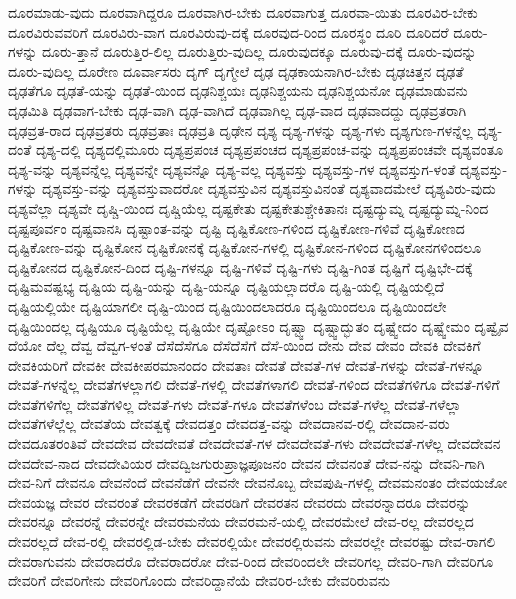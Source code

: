 {ದೂರಮಾಡು-ವುದು
ದೂರವಾಗಿದ್ದರೂ
ದೂರವಾಗಿರ-ಬೇಕು
ದೂರವಾಗುತ್ತ
ದೂರವಾ-ಯಿತು
ದೂರವಿರ-ಬೇಕು
ದೂರವಿರುವವರಿಗೆ
ದೂರವಿರು-ವಾಗ
ದೂರವಿರುವು-ದಕ್ಕೆ
ದೂರವುದ-ರಿಂದ
ದೂರಸ್ಥಂ
ದೂರಿ
ದೂರಿದರೆ
ದೂರು-ಗಳನ್ನು
ದೂರು-ತ್ತಾನೆ
ದೂರುತ್ತಿರ-ಲಿಲ್ಲ
ದೂರುತ್ತಿರು-ವುದಿಲ್ಲ
ದೂರುವುದಕ್ಕೂ
ದೂರುವು-ದಕ್ಕೆ
ದೂರು-ವುದನ್ನು
ದೂರು-ವುದಿಲ್ಲ
ದೂರೇಣ
ದೂರ್ವಾಸರು
ದೃಗ್
ದೃಗ್ಮೇಲೆ
ದೃಢ
ದೃಢಕಾಯನಾಗಿರ-ಬೇಕು
ದೃಢಚಿತ್ತನ
ದೃಢತೆ
ದೃಢತೆಗೂ
ದೃಢತೆ-ಯನ್ನು
ದೃಢತೆ-ಯಿಂದ
ದೃಢನಿಶ್ಚಯಃ
ದೃಢನಿಶ್ಚಯನು
ದೃಢನಿಶ್ಚಯನೋ
ದೃಢಮಾಡುವನು
ದೃಢಮಿತಿ
ದೃಢವಾಗ-ಬೇಕು
ದೃಢ-ವಾಗಿ
ದೃಢ-ವಾಗಿದೆ
ದೃಢವಾಗಿಲ್ಲ
ದೃಢ-ವಾದ
ದೃಢವಾದದ್ದು
ದೃಢವ್ರತರಾಗಿ
ದೃಢವ್ರತ-ರಾದ
ದೃಢವ್ರತರು
ದೃಢವ್ರತಾಃ
ದೃಢವ್ರತಿ
ದೃಢೇನ
ದೃಶ್ಯ
ದೃಶ್ಯ-ಗಳನ್ನು
ದೃಶ್ಯ-ಗಳು
ದೃಶ್ಯಗುಣ-ಗಳನ್ನೆಲ್ಲ
ದೃಶ್ಯ-ದಂತೆ
ದೃಶ್ಯ-ದಲ್ಲಿ
ದೃಶ್ಯದಲ್ಲಿಮೂರು
ದೃಶ್ಯಪ್ರಪಂಚ
ದೃಶ್ಯಪ್ರಪಂಚದ
ದೃಶ್ಯಪ್ರಪಂಚ-ವನ್ನು
ದೃಶ್ಯಪ್ರಪಂಚವೇ
ದೃಶ್ಯವಂತೂ
ದೃಶ್ಯ-ವನ್ನು
ದೃಶ್ಯವನ್ನೆಲ್ಲ
ದೃಶ್ಯವನ್ನೇ
ದೃಶ್ಯವನ್ನೊ
ದೃಶ್ಯ-ವಲ್ಲ
ದೃಶ್ಯವಸ್ತು
ದೃಶ್ಯವಸ್ತು-ಗಳ
ದೃಶ್ಯವಸ್ತುಗ-ಳಂತೆ
ದೃಶ್ಯವಸ್ತು-ಗಳನ್ನು
ದೃಶ್ಯವಸ್ತು-ವನ್ನು
ದೃಶ್ಯವಸ್ತುವಾದರೋ
ದೃಶ್ಯವಸ್ತುವಿನ
ದೃಶ್ಯವಸ್ತುವಿನಂತೆ
ದೃಶ್ಯವಾದಮೇಲೆ
ದೃಶ್ಯವಿರು-ವುದು
ದೃಶ್ಯವೆಲ್ಲಾ
ದೃಶ್ಯವೇ
ದೃಷ್ಚಿ-ಯಿಂದ
ದೃಷ್ಚಿಯೆಲ್ಲ
ದೃಷ್ಟಕೇತು
ದೃಷ್ಟಕೇತುಶ್ಚೇಕಿತಾನಃ
ದೃಷ್ಟದ್ಯುಮ್ನ
ದೃಷ್ಟದ್ಯುಮ್ನ-ನಿಂದ
ದೃಷ್ಟಪೂರ್ವಂ
ದೃಷ್ಟವಾನಸಿ
ದೃಷ್ಟಾಂತ-ವನ್ನು
ದೃಷ್ಟಿ
ದೃಷ್ಟಿಕೋಣ-ಗಳಿಂದ
ದೃಷ್ಟಿಕೋಣ-ಗಳಿವೆ
ದೃಷ್ಟಿಕೋಣದ
ದೃಷ್ಟಿಕೋಣ-ವನ್ನು
ದೃಷ್ಟಿಕೋನ
ದೃಷ್ಟಿಕೋನಕ್ಕೆ
ದೃಷ್ಟಿಕೋನ-ಗಳಲ್ಲಿ
ದೃಷ್ಟಿಕೋನ-ಗಳಿಂದ
ದೃಷ್ಟಿಕೋನಗಳಿಂದಲೂ
ದೃಷ್ಟಿಕೋನದ
ದೃಷ್ಟಿಕೋನ-ದಿಂದ
ದೃಷ್ಟಿ-ಗಳನ್ನೂ
ದೃಷ್ಟಿ-ಗಳಿವೆ
ದೃಷ್ಟಿ-ಗಳು
ದೃಷ್ಟಿ-ಗಿಂತ
ದೃಷ್ಟಿಗೆ
ದೃಷ್ಟಿಭೇ-ದಕ್ಕೆ
ದೃಷ್ಟಿಮವಷ್ಟಭ್ಯ
ದೃಷ್ಟಿಯ
ದೃಷ್ಟಿ-ಯನ್ನು
ದೃಷ್ಟಿ-ಯನ್ನೂ
ದೃಷ್ಟಿಯಲ್ಲಾದರೊ
ದೃಷ್ಟಿ-ಯಲ್ಲಿ
ದೃಷ್ಟಿಯಲ್ಲಿದೆ
ದೃಷ್ಟಿಯಲ್ಲಿಯೇ
ದೃಷ್ಟಿಯಾಗಲೀ
ದೃಷ್ಟಿ-ಯಿಂದ
ದೃಷ್ಟಿಯಿಂದಲಾದರೂ
ದೃಷ್ಟಿಯಿಂದಲೂ
ದೃಷ್ಟಿಯಿಂದಲೇ
ದೃಷ್ಟಿಯಿಂದಲ್ಲ
ದೃಷ್ಟಿಯೂ
ದೃಷ್ಟಿಯೆಲ್ಲ
ದೃಷ್ಟಿಯೇ
ದೃಷ್ಟೋಽಂ
ದೃಷ್ಟ್ವಾ
ದೃಷ್ಟ್ವಾದ್ಭುತಂ
ದೃಷ್ಟ್ವೇದಂ
ದೃಷ್ಟ್ವೇಮಂ
ದೃಷ್ವೈವ
ದೆಯೋ
ದೆಲ್ಲ
ದೆವ್ವ
ದೆವ್ವಗ-ಳಂತೆ
ದೆಸೆದೆಸೆಗೂ
ದೆಸೆದೆಸೆಗೆ
ದೆಸೆ-ಯಿಂದ
ದೇನು
ದೇವ
ದೇವಂ
ದೇವಕಿ
ದೇವಕಿಗೆ
ದೇವಕಿಯರಿಗೆ
ದೇವಕೀ
ದೇವಕೀಪರಮಾನಂದಂ
ದೇವತಾಃ
ದೇವತೆ
ದೇವತೆ-ಗಳ
ದೇವತೆ-ಗಳನ್ನು
ದೇವತೆ-ಗಳನ್ನೂ
ದೇವತೆ-ಗಳನ್ನೆಲ್ಲ
ದೇವತೆಗಳಲ್ಲಾಗಲಿ
ದೇವತೆ-ಗಳಲ್ಲಿ
ದೇವತೆಗಳಾಗಲಿ
ದೇವತೆ-ಗಳಿಂದ
ದೇವತೆಗಳಿಗೂ
ದೇವತೆ-ಗಳಿಗೆ
ದೇವತೆಗಳಿಗೆಲ್ಲ
ದೇವತೆಗಳಿಲ್ಲ
ದೇವತೆ-ಗಳು
ದೇವತೆ-ಗಳೂ
ದೇವತೆಗಳೆಂಬ
ದೇವತೆ-ಗಳೆಲ್ಲ
ದೇವತೆ-ಗಳೆಲ್ಲಾ
ದೇವತೆಗಳೆಲ್ಲೆಲ್ಲ
ದೇವತೆಯ
ದೇವತ್ವಕ್ಕೆ
ದೇವದತ್ತಂ
ದೇವದತ್ತ-ವನ್ನು
ದೇವದಾನವ-ರಲ್ಲಿ
ದೇವದಾನ-ವರು
ದೇವದೂತರಂತಿವೆ
ದೇವದೇವ
ದೇವದೇವತೆ
ದೇವದೇವತೆ-ಗಳ
ದೇವದೇವತೆ-ಗಳು
ದೇವದೇವತೆ-ಗಳೆಲ್ಲ
ದೇವದೇವನ
ದೇವದೇವ-ನಾದ
ದೇವದೇವಿಯರ
ದೇವದ್ವಿಜಗುರುಪ್ರಾಜ್ಞಪೂಜನಂ
ದೇವನ
ದೇವನಂತೆ
ದೇವ-ನನ್ನು
ದೇವನಿ-ಗಾಗಿ
ದೇವ-ನಿಗೆ
ದೇವನೂ
ದೇವನೆಂದೆ
ದೇವನೆಡೆಗೆ
ದೇವನೇ
ದೇವನೊಬ್ಬ
ದೇವಪುಷಿ-ಗಳಲ್ಲಿ
ದೇವಮನಂತಂ
ದೇವಯಜೋ
ದೇವಯಜ್ಞ
ದೇವರ
ದೇವರಂತೆ
ದೇವರಕಡೆಗೆ
ದೇವರಡಿಗೆ
ದೇವರತನ
ದೇವರದು
ದೇವರನ್ನಾದರೂ
ದೇವರನ್ನು
ದೇವರನ್ನೂ
ದೇವರನ್ನೆ
ದೇವರನ್ನೇ
ದೇವರಮನೆಯ
ದೇವರಮನೆ-ಯಲ್ಲಿ
ದೇವರಮೇಲೆ
ದೇವ-ರಲ್ಲ
ದೇವರಲ್ಲದ
ದೇವರಲ್ಲದೆ
ದೇವ-ರಲ್ಲಿ
ದೇವರಲ್ಲಿಡ-ಬೇಕು
ದೇವರಲ್ಲಿಯೇ
ದೇವರಲ್ಲಿರುವನು
ದೇವರಲ್ಲೇ
ದೇವರಷ್ಟು
ದೇವ-ರಾಗಲಿ
ದೇವರಾಗುವನು
ದೇವರಾದರೊ
ದೇವರಾದರೋ
ದೇವ-ರಿಂದ
ದೇವರಿಂದಲೇ
ದೇವರಿಗಲ್ಲ
ದೇವರಿ-ಗಾಗಿ
ದೇವರಿಗೂ
ದೇವರಿಗೆ
ದೇವರಿಗೇನು
ದೇವರಿಗೊಂದು
ದೇವರಿದ್ದಾನೆಯೆ
ದೇವರಿರ-ಬೇಕು
ದೇವರಿರುವನು
}
